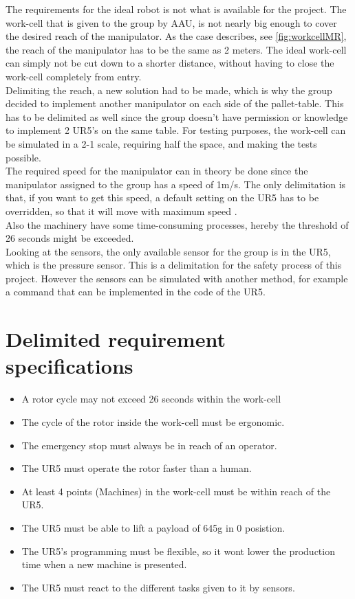 The requirements for the ideal robot is not what is available for the project. 
The work-cell that is given to the group by AAU, is not nearly big enough to cover the desired reach of the manipulator. As the case describes, see \ref{fig:workcellMR}, the reach of the manipulator has to be the same as 2 meters. The ideal work-cell can simply not be cut down to a shorter distance, without having to close the work-cell completely from entry.\\
Delimiting the reach, a new solution had to be made, which is why the group decided to implement another manipulator on each side of the pallet-table. This has to be delimited as well since the group doesn't have permission or knowledge to implement 2 UR5's on the same table.
For testing purposes, the work-cell can be simulated in a 2-1 scale, requiring half the space, and making the tests possible. \\
The required speed for the manipulator can in theory be done since the manipulator assigned to the group has a speed of 1m/s. The only delimitation is that, if you want to get this speed, a default setting on the UR5 has to be overridden, so that it will move with maximum speed \cite{UserManual}.\\
Also the machinery have some time-consuming processes, hereby the threshold of 26 seconds might be exceeded.\\
Looking at the sensors, the only available sensor for the group is in the UR5, which is the pressure sensor. This is a delimitation for the safety process of this project. However the sensors can be simulated with another method, for example a command that can be implemented in the code of the UR5.\\

\section{Delimited requirement specifications}

\begin{itemize}
    \item A rotor cycle may not exceed 26 seconds within the work-cell
    \item The cycle of the rotor inside the work-cell must be ergonomic.
    \item The emergency stop must always be in reach of an operator.
    \item The UR5 must operate the rotor faster than a human.
    \item At least 4 points (Machines) in the work-cell must be within reach of the UR5.
    \item The UR5 must be able to lift a payload of 645g in 0 posistion.
    \item The UR5's programming must be flexible, so it wont lower the production time when a new machine is presented.
    \item The UR5 must react to the different tasks given to it by sensors.
\end{itemize}